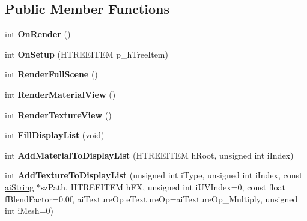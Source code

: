 \subsection*{Public Member Functions}
\begin{DoxyCompactItemize}
\item 
\hypertarget{class_c_display_acd88285897b2d86f95cb5f744846baf0}{int {\bfseries On\+Render} ()}\label{class_c_display_acd88285897b2d86f95cb5f744846baf0}

\item 
\hypertarget{class_c_display_a2b9e92b0049f518fb07cda3aba368887}{int {\bfseries On\+Setup} (H\+T\+R\+E\+E\+I\+T\+E\+M p\+\_\+h\+Tree\+Item)}\label{class_c_display_a2b9e92b0049f518fb07cda3aba368887}

\item 
\hypertarget{class_c_display_afd416c30a1bc98b2a5bf89021f693266}{int {\bfseries Render\+Full\+Scene} ()}\label{class_c_display_afd416c30a1bc98b2a5bf89021f693266}

\item 
\hypertarget{class_c_display_a0117d99c70972fffdc49ac71e197f2ee}{int {\bfseries Render\+Material\+View} ()}\label{class_c_display_a0117d99c70972fffdc49ac71e197f2ee}

\item 
\hypertarget{class_c_display_af3cd807a66d427a2faae6556b2a993e1}{int {\bfseries Render\+Texture\+View} ()}\label{class_c_display_af3cd807a66d427a2faae6556b2a993e1}

\item 
\hypertarget{class_c_display_a1a4929c2671b75fa6b58a764017c9f68}{int {\bfseries Fill\+Display\+List} (void)}\label{class_c_display_a1a4929c2671b75fa6b58a764017c9f68}

\item 
\hypertarget{class_c_display_a1dca8fd5181cc1b8f7eb1eaf8d114df0}{int {\bfseries Add\+Material\+To\+Display\+List} (H\+T\+R\+E\+E\+I\+T\+E\+M h\+Root, unsigned int i\+Index)}\label{class_c_display_a1dca8fd5181cc1b8f7eb1eaf8d114df0}

\item 
\hypertarget{class_c_display_a596188e8ce9ab0d3318240c8ae2be723}{int {\bfseries Add\+Texture\+To\+Display\+List} (unsigned int i\+Type, unsigned int i\+Index, const \hyperlink{structai_string}{ai\+String} $\ast$sz\+Path, H\+T\+R\+E\+E\+I\+T\+E\+M h\+F\+X, unsigned int i\+U\+V\+Index=0, const float f\+Blend\+Factor=0.\+0f, ai\+Texture\+Op e\+Texture\+Op=ai\+Texture\+Op\+\_\+\+Multiply, unsigned int i\+Mesh=0)}\label{class_c_display_a596188e8ce9ab0d3318240c8ae2be723}


\end{DoxyCompactItemize}
